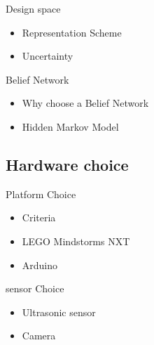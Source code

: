 \begin{frame}{Design space}
\begin{itemize}
\item Representation Scheme
\item Uncertainty
\end{itemize}
\end{frame}

\begin{frame}{Belief Network}
\begin{itemize}
 \item Why choose a Belief Network
 \item Hidden Markov Model
\end{itemize}
\end{frame}

\subsection{Hardware choice}
\begin{frame}{Platform Choice}
\begin{itemize}
 \item Criteria
 \item LEGO Mindstorms NXT
 \item Arduino
\end{itemize}
\end{frame}

\begin{frame}{sensor Choice}
\begin{itemize}
 \item Ultrasonic sensor
 \item Camera
\end{itemize}
\end{frame}
 
